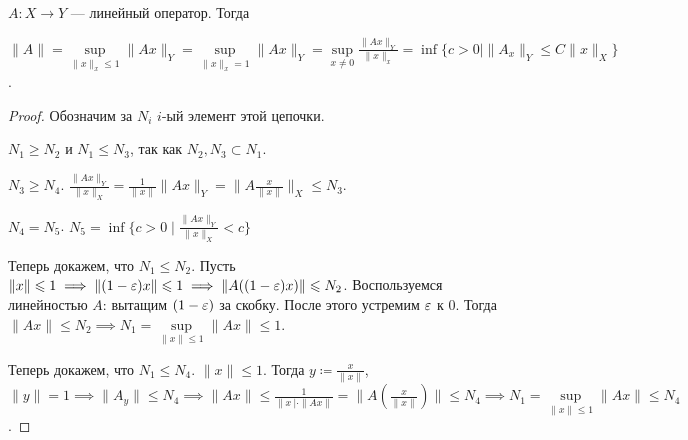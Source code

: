 \begin{theorem}
    $A\!: X \to Y$ --- линейный оператор. Тогда

     $\|A\| = \sup\limits_{\| x\|_x \le 1} \|Ax\|_Y = \sup\limits_{\| x\|_x = 1} \|Ax\|_Y = \sup\limits_{x \neq 0} \frac{\|Ax\|_Y}{\|x\|_x} = \inf\{ c > 0 \mid \|A_x\|_Y \le C \|x\|_X\}$.
\end{theorem}
\begin{proof}
    Обозначим за $N_i$  $i$-ый элемент этой цепочки. 

     $N_1 \ge N_2$ и $N_1 \le N_3$,  так как $N_2, N_3 \subset N_1$. 

     $N_3 \ge N_4$. $\frac{\|Ax\|_Y}{\|x\|_X} = \frac{1}{\|x\|}\|Ax\|_Y = \|A \frac{x}{\|x\|}\|_X \le N_3$.

     $N_4 = N_5$. $N_5 = \inf \{ c>0 \mid \frac{\|Ax\|_Y}{\|x\|_X} < c\}$

     Теперь докажем, что $N_1 \le N_2$. Пусть $\| x \| \leqslant 1 \implies \| (1-\varepsilon) x \| \leqslant 1 \implies \| A((1-\varepsilon)x) \| \leqslant N_2$. Воспользуемся линейностью $A$: вытащим  $(1-\varepsilon)$ за скобку. После этого устремим  $\varepsilon$ к 0. Тогда  $\| Ax \| \le N_2 \implies N_1 = \sup\limits_{\| x \| \le 1} \| A x\| \le 1$.

     Теперь докажем, что $N_1 \le N_4$. $\| x \| \le 1$. Тогда $y \coloneqq \frac{x}{\| x \|}$, $\|y\| = 1 \implies \| A_y \| \le N_4 \implies \| Ax \| \le \frac{1}{\|x \ | \cdot \| Ax \|} = \| A(\frac{x}{\| x \|}) \|  \le N_4 \implies N_1 = \sup\limits_{\|x \| \le 1} \|Ax\| \le N_4$.
\end{proof}

